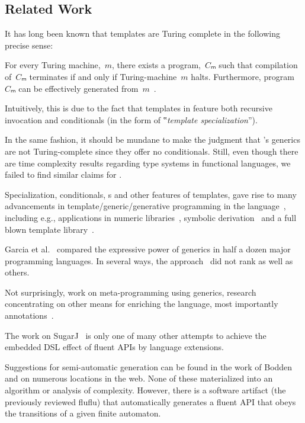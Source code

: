 \subsection{Related Work}

It has long been known
  that \CC templates are Turing complete in the following precise sense:

\begin{Proposition}
  \label{Theorem:Gutterman}
  For every Turing machine,~$m$, there exists a \CC program,~$Cₘ$ such that
    compilation of~$Cₘ$ terminates if and only if
      Turing-machine~$m$ halts.
      Furthermore, program~$Cₘ$ can be effectively generated from~$m$~\cite{Gutterman:2003}.
\end{Proposition}

Intuitively, this is due to the fact that templates in \CC
  feature both recursive invocation and conditionals (in the form of
  ‟\emph{template specialization}”).

In the same fashion, it should be mundane to make the judgment that
  \Java's generics are not Turing-complete since they offer no conditionals.
Still, even though there are time complexity results regarding type systems in functional
  languages, we failed to find similar claims for \Java.

Specialization, conditionals, s and other features of \CC templates,
  gave rise to many advancements in template/generic/generative programming
  in the language~\cite{Austern:98,Musser:Stepanov:1989,Backhouse:Jansson:1999,Dehnert:Stepanov:2000},
  including e.g., applications in numeric libraries~\cite{Veldhuizen:95,Vandevoorde:Josuttis:02},
  symbolic derivation~\cite{Gil:Gutterman:98}
  and a full blown template library~\cite{Abrahams:Gurtovoy:04}.

Garcia et al.~\cite{Garcia:Jarvi:Lumsdaine:Siek:Willcock:03} compared
  the expressive power of generics in half a dozen major programming languages.
  In several ways, the \Java approach~\cite{Bracha:Odersky:Stoutamire:Wadler:98}
  did not rank as well as others.

Not surprisingly, work on meta-programming using \Java generics,
  research concentrating on other means for enriching the language,
  most importantly annotations~\cite{Papi:08}.

The work on SugarJ~\cite{Erdweg:2011} is only one of many other attempts
  to achieve the embedded DSL effect of fluent APIs by language extensions.

Suggestions for semi-automatic generation can be found in the work of
Bodden~\cite{Bodden:14} and on numerous locations in the web.  None of these
materialized into an algorithm or analysis of complexity.  However, there is a
software artifact (the previously reviewed
fluflu) that automatically generates a
fluent API that obeys the transitions of a given finite automaton.

